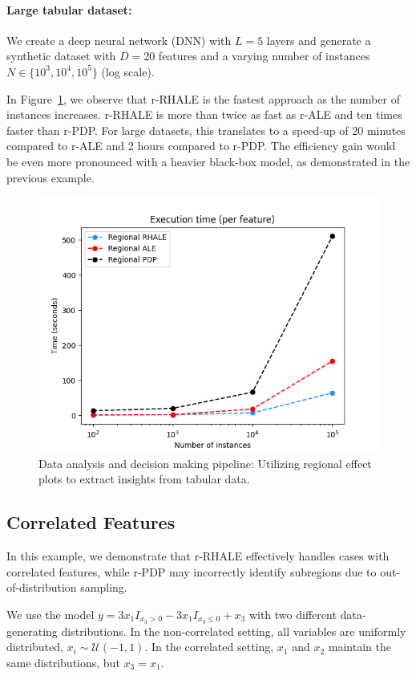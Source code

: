 \documentclass[
twocolumn,
]{ceurart}
\begin{document}
\paragraph{Large tabular dataset:}

We create a deep neural network (DNN) with \( L = 5 \) layers and generate a synthetic dataset with \( D = 20 \) features and a varying number of instances \( N \in \{10^3, 10^4, 10^5\} \) (log scale).

In Figure~\ref{fig:efficiency_nof_instances}, we observe that r-RHALE is the fastest approach as the number of instances increases. r-RHALE is more than twice as fast as r-ALE and ten times faster than r-PDP. For large datasets, this translates to a speed-up of 20 minutes compared to r-ALE and 2 hours compared to r-PDP. The efficiency gain would be even more pronounced with a heavier black-box model, as demonstrated in the previous example.

\begin{figure}
    \centering
    \includegraphics[width=.49\textwidth]{figures/simulation_2/efficiency_samples.png}
    \caption{Data analysis and decision making pipeline: Utilizing regional effect plots to extract insights from tabular data.}
    \label{fig:efficiency_nof_instances}
\end{figure}


\subsection{Correlated Features}
\label{sec:correlated-features}

In this example, we demonstrate that r-RHALE effectively handles cases with correlated features, while r-PDP may incorrectly identify subregions due to out-of-distribution sampling.

We use the model \( y = 3x_1I_{x_3 > 0} - 3x_1I_{x_3 \leq 0} + x_3 \) with two different data-generating distributions. In the non-correlated setting, all variables are uniformly distributed, \( x_i \sim \mathcal{U}(-1,1) \). In the correlated setting, \( x_1 \) and \( x_2 \) maintain the same distributions, but \( x_3 = x_1 \).
\end{document}
